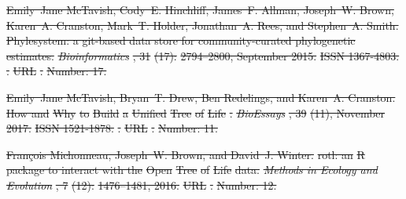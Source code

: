 \documentclass[oupdraft]{sysbio_sse}
\providecommand{\DIFdel}[1]{{\protect\color{red}\sout{#1}}}                      %
\begin{document}
\DIFdel{Emily~Jane McTavish, Cody~E. Hinchliff, James~F. Allman, Joseph~W. Brown,
  Karen~A. Cranston, Mark~T. Holder, Jonathan~A. Rees, and Stephen~A. Smith.
}%
\DIFdel{Phylesystem: a git-based data store for community-curated
  phylogenetic estimates.
}%
\emph{\DIFdel{Bioinformatics}}%
\DIFdel{, 31}%
\DIFdel{(17):}%
\DIFdel{2794--2800,
  September 2015.
}%
\DIFdel{ISSN 1367-4803.
}%
\DIFdel{.
}%
\DIFdel{URL
  }%
\DIFdel{.
}%
\DIFdel{Number: 17.
}%

\DIFdel{Emily~Jane McTavish, Bryan~T. Drew, Ben Redelings, and Karen~A. Cranston.
}%
\DIFdel{How and }%
\DIFdel{Why}%
\DIFdel{to }%
\DIFdel{Build}%
\DIFdel{a }%
\DIFdel{Unified}%
\DIFdel{Tree}%
\DIFdel{of }%
\DIFdel{Life}%
\DIFdel{.
}%
\emph{\DIFdel{BioEssays}}%
\DIFdel{, 39}%
\DIFdel{(11), November 2017.
}%
\DIFdel{ISSN 1521-1878.
}%
\DIFdel{.
}%
\DIFdel{URL
  }%
\DIFdel{.
}%
\DIFdel{Number: 11.
}%

\DIFdel{François Michonneau, Joseph~W. Brown, and David~J. Winter.
}%
\DIFdel{rotl: an }%
\DIFdel{R}%
\DIFdel{package to interact with the }%
\DIFdel{Open}%
\DIFdel{Tree}%
\DIFdel{of }%
\DIFdel{Life}%
\DIFdel{data.
}%
\emph{\DIFdel{Methods in Ecology and Evolution}}%
\DIFdel{, 7}%
\DIFdel{(12):}%
\DIFdel{1476--1481, 2016.
}%
\DIFdel{URL
  }%
\DIFdel{.
}%
\DIFdel{Number: 12.
}%
\end{document}
